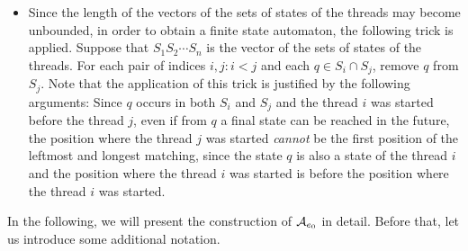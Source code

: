 \begin{itemize}
%
%
	\item Since the length of the vectors of the sets of states of the threads may become unbounded, in order to obtain a finite state automaton, the following trick is applied. 
    Suppose that $S_1 S_2 \cdots S_n$ is the vector of the sets of states of the threads. 
    For each pair of indices $i, j: i < j$ and each $q \in S_i \cap S_j$, remove $q$ from $S_j$. 
    Note that the application of this trick is justified by the following arguments: Since $q$ occurs in both $S_i$ and $S_j$ and the thread $i$ was started before the thread $j$, even if from $q$  a final state can be reached in the future, the position where the thread $j$ was started \emph{cannot} be the first position of the leftmost and longest matching, since the state $q$ is also a state of the thread $i$ and the position where the thread $i$ was started is before the position where the thread $i$ was started.
\end{itemize}

In the following, we will present the construction of $\mathcal{A}_{e_0}$ in detail. Before that, let us introduce some additional notation.

